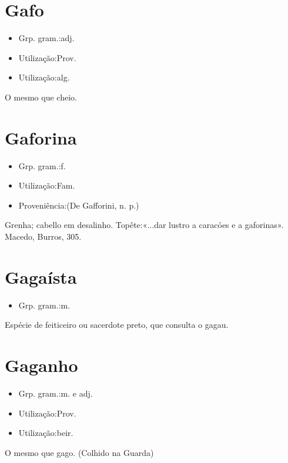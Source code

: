 \section{Gafo}
\begin{itemize}
\item {Grp. gram.:adj.}
\end{itemize}
\begin{itemize}
\item {Utilização:Prov.}
\end{itemize}
\begin{itemize}
\item {Utilização:alg.}
\end{itemize}
O mesmo que \textunderscore cheio\textunderscore .
\section{Gaforina}
\begin{itemize}
\item {Grp. gram.:f.}
\end{itemize}
\begin{itemize}
\item {Utilização:Fam.}
\end{itemize}
\begin{itemize}
\item {Proveniência:(De \textunderscore Gafforini\textunderscore , n. p.)}
\end{itemize}
Grenha; cabello em desalinho.
Topête:«\textunderscore ...dar lustro a caracóes e a gaforinas\textunderscore ». Macedo, \textunderscore Burros\textunderscore , 305.
\section{Gagaísta}
\begin{itemize}
\item {Grp. gram.:m.}
\end{itemize}
Espécie de feiticeiro ou sacerdote preto, que consulta o gagau.
\section{Gaganho}
\begin{itemize}
\item {Grp. gram.:m.  e  adj.}
\end{itemize}
\begin{itemize}
\item {Utilização:Prov.}
\end{itemize}
\begin{itemize}
\item {Utilização:beir.}
\end{itemize}
O mesmo que \textunderscore gago\textunderscore . (Colhido na Guarda)
